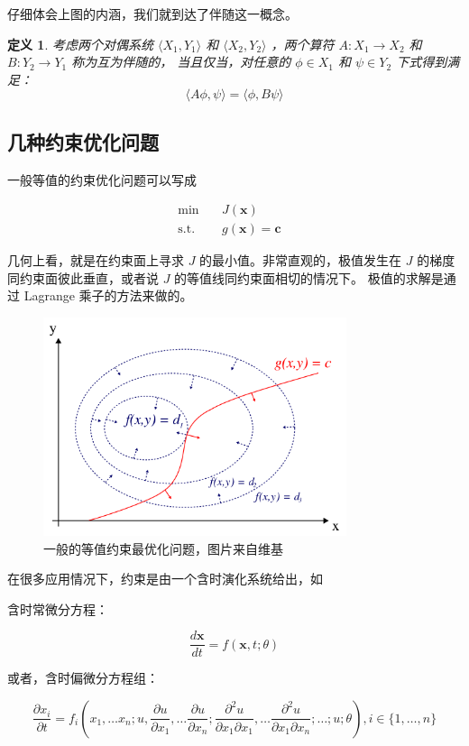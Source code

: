 \documentclass[a4paper,12pt]{article}
\newtheorem{definition}{定义}
\begin{document}
仔细体会上图的内涵，我们就到达了伴随这一概念。

\begin{definition}
\label{d1}
考虑两个对偶系统 $ \langle X_1, Y_1 \rangle $ 和 $ \langle X_2, Y_2 \rangle $ ，两个算符 $ A : X_1 \to X_2$ 和  $B : Y_2 \to Y_1 $ 称为互为伴随的，
当且仅当，对任意的 $ \phi \in X_1 $ 和 $ \psi \in Y_2 $ 下式得到满足：$$ \langle A \phi, \psi \rangle = \langle \phi, B \psi \rangle $$
\end{definition}

\subsection{几种约束优化问题}

一般等值的约束优化问题可以写成

$$
\begin{array}{rcll}
\min &~& J(\mathbf{x}) & \\
\mathrm{s.t.} &~& g(\mathbf{x}) = \mathbf{c}
\end{array}
$$

几何上看，就是在约束面上寻求 $ J $ 的最小值。非常直观的，极值发生在 $ J $ 的梯度同约束面彼此垂直，或者说 $ J $ 的等值线同约束面相切的情况下。
极值的求解是通过 Lagrange 乘子的方法来做的。

\begin{figure}[ht]
\centering
\includegraphics[width=3.5in]{images/adjoint/lagrange_multiplier.png}
\caption{一般的等值约束最优化问题，图片来自维基}
\end{figure}

在很多应用情况下，约束是由一个含时演化系统给出，如

含时常微分方程：

$$
\frac{d\mathbf{x}}{dt} = f(\mathbf{x}, t; \theta)
$$

或者，含时偏微分方程组：

$$
\frac{\partial x_i}{\partial t} = f_i \left( x_1, \ldots x_n; u, \frac{\partial u}{\partial x_1}, \ldots \frac{\partial u}{\partial x_n}; \frac{\partial^2 u}{\partial x_1 \partial x_1}, \ldots \frac{\partial^2 u}{\partial x_1 \partial x_n}; \ldots ; u; \theta \right), i \in \{1, \ldots , n\}
$$
\end{document}

